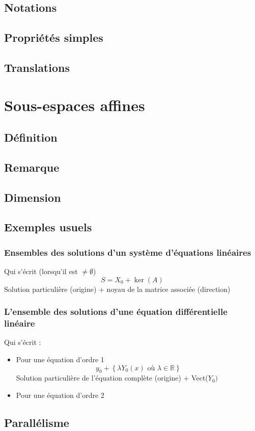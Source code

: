 \documentclass[12pt,a4paper,french]{book}
\begin{document}
		\subsection{Notations}
		\subsection{Propriétés simples}
		\subsection{Translations}
	\section{Sous-espaces affines}
		\subsection{Définition}
		\subsection{Remarque}
		\subsection{Dimension}
		\subsection{Exemples usuels}
			\subsubsection{Ensembles des solutions d'un système d'équations linéaires}
				Qui s'écrit (lorsqu'il est $\neq \emptyset$)
				\[S = X_0 + \ker(A)\] Solution particulière (origine) + noyau de la matrice associée (direction)
			\subsubsection{L'ensemble des solutions d'une équation différentielle linéaire}
				Qui s'écrit :
				\begin{itemize}
					\item Pour une équation d'ordre 1
					\[y_0 + \left\lbrace \lambda Y_0(x) \mbox{ où } \lambda \in \mathbb{R}\right\rbrace \]
					Solution particulière de l'équation complète (origine) + Vect($Y_0)$
					\item Pour une équation d'ordre 2
				\end{itemize}
		\subsection{Parallélisme}
\end{document}
